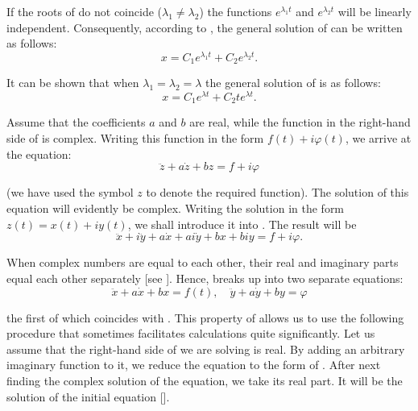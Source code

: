 If the roots of  do not coincide ($\lambda_1\neq\lambda_2$) the functions $e^{\lambda_1 t}$ and $e^{\lambda_2 t}$ will be linearly independent. Consequently, according to , the general solution of  can be written as follows:
\begin{equation}\label{eq:7_45}
	x = C_1 e^{\lambda_1 t} + C_2 e^{\lambda_2 t}.
\end{equation}

\noindent
It can be shown that when $\lambda_1=\lambda_2=\lambda$ the general solution of  is as follows:
\begin{equation}\label{eq:7_46}
	x = C_1 e^{\lambda t} + C_2 t e^{\lambda t}.
\end{equation}

Assume that the coefficients $a$ and $b$ are real, while the function in the right-hand side of  is complex. Writing this function in the form $f(t)+i\varphi(t)$, we arrive at the equation:
\begin{equation}\label{eq:7_47}
	\ddot{z} + a\dot{z} + bz = f + i\varphi
\end{equation}

\noindent
(we have used the symbol $z$ to denote the required function). The solution of this equation will evidently be complex. Writing the solution in the form $z(t)=x(t)+iy(t)$, we shall introduce it into . The result will be
\begin{equation}\label{eq:7_48}
	\ddot{x} + i\ddot{y} + a\dot{x} + ai\dot{y} + bx + biy = f + i\varphi.
\end{equation}

\noindent
When complex numbers are equal to each other, their real and imaginary parts equal each other separately [see ]. Hence,  breaks up into two separate equations:
\begin{equation}\label{eq:7_49}
	\ddot{x} + a\dot{x} + bx = f(t),\quad \ddot{y} + a\dot{y} + by = \varphi
\end{equation}

\noindent
the first of which coincides with . This property of  allows us to use the following procedure that sometimes facilitates calculations quite significantly. Let us assume that the right-hand side of  we are solving is real. By adding an arbitrary imaginary function to it, we reduce the equation to the form of . After next finding the complex solution of the equation, we take its real part. It will be the solution of the initial equation [].

